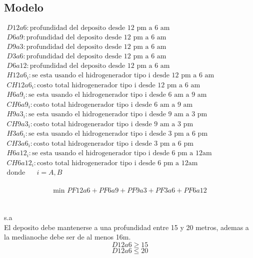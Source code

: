 \subsection{Modelo}
$\begin{array}{l}
D12a6:\mbox{profundidad del deposito desde 12 pm a 6 am}\\
D6a9:\mbox{profundidad del deposito desde 12 pm a 6 am}\\
D9a3:\mbox{profundidad del deposito desde 12 pm a 6 am}\\
D3a6:\mbox{profundidad del deposito desde 12 pm a 6 am}\\
D6a12:\mbox{profundidad del deposito desde 12 pm a 6 am}\\
H12a6_{i}:\mbox{se esta usando el hidrogenerador tipo i desde 12 pm a 6 am}\\
CH12a6_{i}:\mbox{costo total hidrogenerador tipo i desde 12 pm a 6 am}\\
H6a9_{i}:\mbox{se esta usando el hidrogenerador tipo i desde 6 am a 9 am}\\
CH6a9_{i}:\mbox{costo total hidrogenerador tipo i desde 6 am a 9 am}\\
H9a3_{i}:\mbox{se esta usando el hidrogenerador tipo i desde 9 am a 3 pm}\\
CH9a3_{i}:\mbox{costo total hidrogenerador tipo i desde 9 am a 3 pm}\\
H3a6_{i}:\mbox{se esta usando el hidrogenerador tipo i desde 3 pm a 6 pm}\\
CH3a6_{i}:\mbox{costo total hidrogenerador tipo i desde 3 pm a 6 pm}\\
H6a12_{i}:\mbox{se esta usando el hidrogenerador tipo i desde 6 pm a  12am}\\
CH6a12_{i}:\mbox{costo total hidrogenerador tipo i desde 6 pm a  12am}\\
\mbox{donde} \;\;\;\;\;\; i=A,B
\end{array}$
\\
\\
$$ \mbox{min } PF12a6 + PF6a9 + PF9a3 + PF3a6 + PF6a12 $$
\\ 
\\  
s.a\\
El deposito debe mantenerse a una profundidad entre 15 y 20 metros, ademas a la medianoche debe ser de al menos 16m.
\begin{equation}
D12a6 \geq 15 
\end{equation}
\begin{equation}
D12a6 \leq 20
\end{equation}

